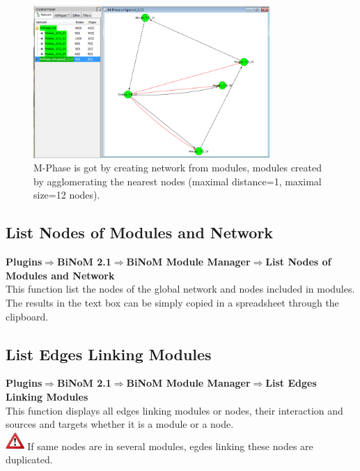 \begin{figure}
\centering
\includegraphics[width=0.8\textwidth]{graphics/M-Phase_packed}
\caption{M-Phase is got by creating network from modules, modules created by agglomerating the nearest nodes (maximal distance=1, maximal size=12 nodes).}
\label{M-Phase_packed}
\end{figure}

\subsection{List Nodes of Modules and Network}
\textbf{Plugins$\Rightarrow$BiNoM 2.1$\Rightarrow$BiNoM Module Manager$\Rightarrow$List Nodes of Modules and Network}\\
This function list the nodes of the global network and nodes included in modules.\\
The results in the text box can be simply copied in a spreadsheet through the clipboard.

\subsection{List Edges Linking Modules}
\textbf{Plugins$\Rightarrow$BiNoM 2.1$\Rightarrow$BiNoM Module Manager$\Rightarrow$List Edges Linking Modules}\\
This function displays all edges linking modules or nodes, their interaction and sources and targets whether it is a module or a node.\\
\includegraphics[width=20pt,height=20pt]{graphics/warning}  If same nodes are in several modules, egdes linking these nodes are duplicated.

